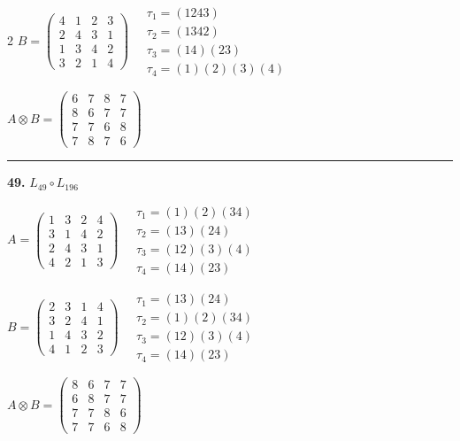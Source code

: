\begin{multicols}{2}
$B = \begin{pmatrix} 4 & 1 & 2 & 3 \\ 2 & 4 & 3 & 1 \\ 1 & 3 & 4 & 2 \\ 3 & 2 & 1 & 4 \end{pmatrix} \quad \begin{matrix} \tau_{1}=(1 2 4 3) \\ \tau_{2}=(1 3 4 2) \\ \tau_{3}=(1 4)(2 3) \\ \tau_{4}=(1)(2)(3)(4) \end{matrix}$

$A \otimes B = \begin{pmatrix} 6 & 7 & 8 & 7 \\ 8 & 6 & 7 & 7 \\ 7 & 7 & 6 & 8 \\ 7 & 8 & 7 & 6 \end{pmatrix}$

\vspace{0.3em}
\hrule
\vspace{0.3em}

\noindent\textbf{49.} $L_{49} \circ L_{196}$

$A = \begin{pmatrix} 1 & 3 & 2 & 4 \\ 3 & 1 & 4 & 2 \\ 2 & 4 & 3 & 1 \\ 4 & 2 & 1 & 3 \end{pmatrix} \quad \begin{matrix} \tau_{1}=(1)(2)(3 4) \\ \tau_{2}=(1 3)(2 4) \\ \tau_{3}=(1 2)(3)(4) \\ \tau_{4}=(1 4)(2 3) \end{matrix}$

$B = \begin{pmatrix} 2 & 3 & 1 & 4 \\ 3 & 2 & 4 & 1 \\ 1 & 4 & 3 & 2 \\ 4 & 1 & 2 & 3 \end{pmatrix} \quad \begin{matrix} \tau_{1}=(1 3)(2 4) \\ \tau_{2}=(1)(2)(3 4) \\ \tau_{3}=(1 2)(3)(4) \\ \tau_{4}=(1 4)(2 3) \end{matrix}$

$A \otimes B = \begin{pmatrix} 8 & 6 & 7 & 7 \\ 6 & 8 & 7 & 7 \\ 7 & 7 & 8 & 6 \\ 7 & 7 & 6 & 8 \end{pmatrix}$


\end{multicols}

